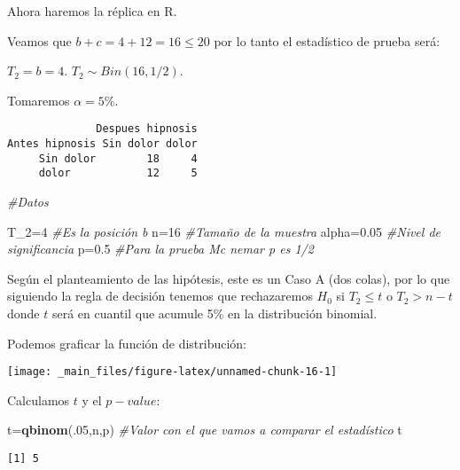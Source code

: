 \documentclass[
  a4paper,
  oneside,
  openany]{book}
\newenvironment{Shaded}{\begin{snugshade}}{\end{snugshade}}
\newcommand{\CommentTok}[1]{\textcolor[rgb]{0.56,0.35,0.01}{\textit{#1}}}
\newcommand{\DecValTok}[1]{\textcolor[rgb]{0.00,0.00,0.81}{#1}}
\newcommand{\FloatTok}[1]{\textcolor[rgb]{0.00,0.00,0.81}{#1}}
\newcommand{\FunctionTok}[1]{\textcolor[rgb]{0.13,0.29,0.53}{\textbf{#1}}}
\newcommand{\NormalTok}[1]{#1}
\newcommand{\OtherTok}[1]{\textcolor[rgb]{0.56,0.35,0.01}{#1}}
\begin{document}
Ahora haremos la réplica en R.

Veamos que \(b+c=4+12=16\leq 20\) por lo tanto el estadístico de prueba será:

\(T_2=b=4.\)
\(T_2\sim Bin(16,1/2).\)

Tomaremos \(\alpha=5\%.\)

\begin{verbatim}
              Despues hipnosis
Antes hipnosis Sin dolor dolor
     Sin dolor        18     4
     dolor            12     5
\end{verbatim}

\begin{Shaded}
\begin{Highlighting}[]
\CommentTok{\#Datos}

\NormalTok{T\_2}\OtherTok{=}\DecValTok{4}                    \CommentTok{\#Es la posición b}
\NormalTok{n}\OtherTok{=}\DecValTok{16}                     \CommentTok{\#Tamaño de la muestra}
\NormalTok{alpha}\OtherTok{=}\FloatTok{0.05}               \CommentTok{\#Nivel de significancia}
\NormalTok{p}\OtherTok{=}\FloatTok{0.5}                    \CommentTok{\#Para la prueba Mc nemar p es 1/2}
\end{Highlighting}
\end{Shaded}

Según el planteamiento de las hipótesis, este es un Caso A (dos colas), por lo que siguiendo la regla de decisión tenemos que rechazaremos \(H_0\) si \(T_2 \leq t\) o \(T_2>n-t\) donde \(t\) será en cuantil que acumule 5\% en la distribución binomial.

Podemos graficar la función de distribución:

\begin{center}\texttt{[image: \_main\_files/figure-latex/unnamed-chunk-16-1]} \end{center}

Calculamos \(t\) y el \(p-value\):

\begin{Shaded}
\begin{Highlighting}[]
\NormalTok{t}\OtherTok{=}\FunctionTok{qbinom}\NormalTok{(.}\DecValTok{05}\NormalTok{,n,p)       }\CommentTok{\#Valor con el que vamos a comparar el estadístico}
\NormalTok{t}
\end{Highlighting}
\end{Shaded}

\begin{verbatim}
[1] 5
\end{verbatim}
\end{document}
